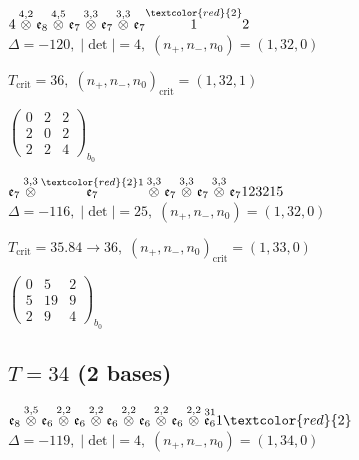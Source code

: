 \documentclass[10pt]{article}
\begin{document}
$4\overset{4,2}{\otimes}\mathfrak{e}_8\overset{4,5}{\otimes}\mathfrak{e}_7\overset{3,3}{\otimes}\mathfrak{e}_7\overset{3,3}{\otimes}\mathfrak{e}_7\overset{\textcolor{red}{2}}{1}2$ \quad $\Delta=-120,\; |\det|=4,\; (n_+,n_-,n_0)=(1,32,0)$

\hspace{1em}$T_{\text{crit}}=36,\; (n_+,n_-,n_0)_{\text{crit}}=(1,32,1)$

\hspace{2em}$\left(\begin{smallmatrix}0 & 2 & 2 \\ 2 & 0 & 2 \\ 2 & 2 & 4\end{smallmatrix}\right)_{\!b_0}$

\smallskip

$\mathfrak{e}_7\overset{3,3}{\otimes}\overset{\textcolor{red}{2}1}{\mathfrak{e}_7}\overset{3,3}{\otimes}\mathfrak{e}_7\overset{3,3}{\otimes}\mathfrak{e}_7\overset{3,3}{\otimes}\mathfrak{e}_7123215$ \quad $\Delta=-116,\; |\det|=25,\; (n_+,n_-,n_0)=(1,32,0)$

\hspace{1em}$T_{\text{crit}}=35.84 \to 36,\; (n_+,n_-,n_0)_{\text{crit}}=(1,33,0)$

\hspace{2em}$\left(\begin{smallmatrix}0 & 5 & 2 \\ 5 & 19 & 9 \\ 2 & 9 & 4\end{smallmatrix}\right)_{\!b_0}$


\subsection*{$T = 34$ \quad (2 bases)}
\smallskip

$\mathfrak{e}_8\overset{3,5}{\otimes}\mathfrak{e}_6\overset{2,2}{\otimes}\mathfrak{e}_6\overset{2,2}{\otimes}\mathfrak{e}_6\overset{2,2}{\otimes}\mathfrak{e}_6\overset{2,2}{\otimes}\mathfrak{e}_6\overset{2,2}{\otimes}\overset{31}{\mathfrak{e}_6}1\textcolor{red}{2}$ \quad $\Delta=-119,\; |\det|=4,\; (n_+,n_-,n_0)=(1,34,0)$
\end{document}
